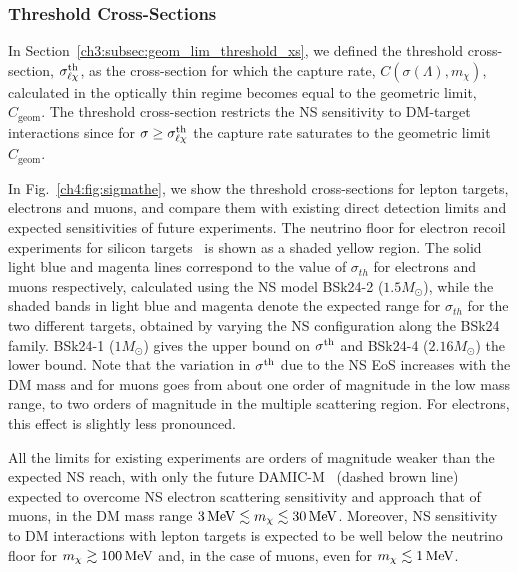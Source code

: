 \subsubsection{Threshold Cross-Sections}
\label{ch4:subsubsec:thxs}

In Section~\ref{ch3:subsec:geom_lim_threshold_xs}, we defined the threshold cross-section, $\sigma^{\rm th}_{\ell\chi}$, as the cross-section for which the capture rate, $C(\sigma(\Lambda),m_\chi)$, calculated in the optically thin regime becomes equal to the geometric limit, $C_\mathrm{geom}$. 
The threshold cross-section restricts the NS sensitivity to DM-target interactions since for $\sigma\ge\sigma^{\rm th}_{\ell\chi}$ the capture rate saturates to the geometric limit $C_\mathrm{geom}$. 



In Fig.~\ref{ch4:fig:sigmathe}, we show the threshold cross-sections for lepton targets, electrons and muons, and compare them with existing direct detection limits and expected sensitivities of future experiments. The neutrino floor for electron recoil experiments for silicon targets~\cite{Essig:2018tss_Solarneutrinossignal} is shown as a shaded yellow region.
The solid light blue and magenta lines correspond to the value of $\sigma_{th}$ for electrons and muons respectively, calculated using the NS model BSk24-2  ($1.5 M_\odot$), while the shaded bands in light blue and magenta denote the expected range for $\sigma_{th}$ for the two different targets, obtained by varying the NS configuration along the BSk24 family. 
 BSk24-1 ($1M_\odot$) gives the upper bound on $\sigma^{\rm th}$ and BSk24-4 ($2.16 M_\odot$) the lower bound. 
Note that the variation in $\sigma^{\rm th}$ due to the NS EoS increases with the DM mass and for muons goes from about one order of magnitude in the low mass range, to two orders of magnitude in the multiple scattering region. For electrons, this effect is slightly less pronounced.


    
All the limits for existing experiments are orders of magnitude weaker than the expected NS reach, with only the future DAMIC-M~\cite{Essig:2015cda_DirectdetectionsubGeV} (dashed brown line) expected to overcome NS electron scattering sensitivity and approach that of muons, in the DM mass range  $3{\rm \,MeV}\lesssim m_\chi\lesssim 30{\rm \,MeV}$. Moreover, NS sensitivity to DM interactions with lepton targets is expected to be well below the neutrino floor for $m_\chi\gtrsim 100{\rm \,MeV}$ and, in the case of muons, even for $m_\chi\lesssim 1{\rm \,MeV}$. 

